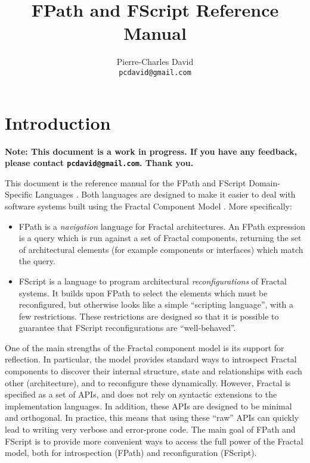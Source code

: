 \documentclass[a4paper,12pt]{report}
\begin{document}
\title{FPath and FScript Reference Manual}
\author{Pierre-Charles David\\\texttt{pcdavid@gmail.com}}

\maketitle
\tableofcontents

\chapter{Introduction}
\label{cha:introduction}

{\large \bf Note: This document is a work in progress. If you have any feedback, please contact
  \texttt{pcdavid@gmail.com}. Thank you.}

\vspace{1em}

\noindent This document is the reference manual for the FPath and FScript Domain-Specific
Languages \citep{david.phd2005}. Both languages are designed to make it easier to deal
with software systems built using the Fractal Component Model
\citep{bruneton-coupaye-stefani.ow2003,bruneton-coupaye-leclercq-al.spe2006}. More
specifically:
\begin{itemize}
\item FPath is a \emph{navigation} language for Fractal architectures. An FPath expression
  is a query which is run against a set of Fractal components, returning the set of
  architectural elements (for example components or interfaces) which match the query.
\item FScript is a language to program architectural \emph{reconfigurations} of Fractal
  systems. It builds upon FPath to select the elements which must be reconfigured, but
  otherwise looks like a simple ``scripting language'', with a few restrictions. These
  restrictions are designed so that it is possible to guarantee that FScript
  reconfigurations are ``well-behaved''.
\end{itemize}

One of the main strengths of the Fractal component model is its support for reflection. In
particular, the model provides standard ways to introspect Fractal components to discover
their internal structure, state and relationships with each other (architecture), and to
reconfigure these dynamically. However, Fractal is specified as a set of APIs, and does
not rely on syntactic extensions to the implementation languages. In addition, these APIs
are designed to be minimal and orthogonal. In practice, this means that using these
``raw'' APIs can quickly lead to writing very verbose and error-prone code. The main goal
of FPath and FScript is to provide more convenient ways to access the full power of the
Fractal model, both for introspection (FPath) and reconfiguration (FScript).
\end{document}
